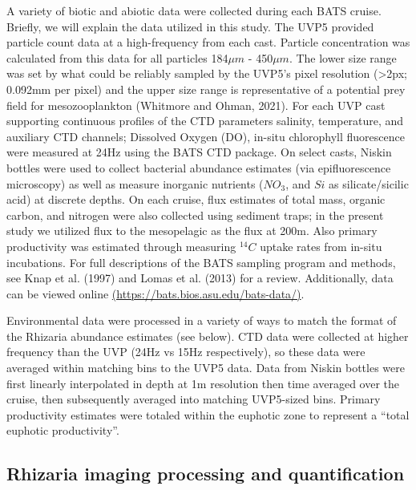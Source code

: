 \documentclass[
]{article}
\begin{document}
A variety of biotic and abiotic data were collected during each BATS
cruise. Briefly, we will explain the data utilized in this study. The
UVP5 provided particle count data at a high-frequency from each cast.
Particle concentration was calculated from this data for all particles
184\(\mu m\) - 450\(\mu m\). The lower size range was set by what could
be reliably sampled by the UVP5's pixel resolution (\textgreater2px;
0.092mm per pixel) and the upper size range is representative of a
potential prey field for mesozooplankton (Whitmore and Ohman, 2021). For
each UVP cast supporting continuous profiles of the CTD parameters
salinity, temperature, and auxiliary CTD channels; Dissolved Oxygen
(DO), in-situ chlorophyll fluorescence were measured at 24Hz using the
BATS CTD package. On select casts, Niskin bottles were used to collect
bacterial abundance estimates (via epifluorescence microscopy) as well
as measure inorganic nutrients (\(NO_3\), and \(Si\) as silicate/sicilic
acid) at discrete depths. On each cruise, flux estimates of total mass,
organic carbon, and nitrogen were also collected using sediment traps;
in the present study we utilized flux to the mesopelagic as the flux at
200m. Also primary productivity was estimated through measuring
\(^{14}C\) uptake rates from in-situ incubations. For full descriptions
of the BATS sampling program and methods, see Knap et al. (1997) and
Lomas et al. (2013) for a review. Additionally, data can be viewed
online
\href{https://bats.bios.asu.edu/bats-data/}{(https://bats.bios.asu.edu/bats-data/)}.

Environmental data were processed in a variety of ways to match the
format of the Rhizaria abundance estimates (see below). CTD data were
collected at higher frequency than the UVP (24Hz vs 15Hz respectively),
so these data were averaged within matching bins to the UVP5 data. Data
from Niskin bottles were first linearly interpolated in depth at 1m
resolution then time averaged over the cruise, then subsequently
averaged into matching UVP5-sized bins. Primary productivity estimates
were totaled within the euphotic zone to represent a ``total euphotic
productivity''.

\hypertarget{rhizaria-imaging-processing-and-quantification}{%
\subsection{Rhizaria imaging processing and
quantification}\label{rhizaria-imaging-processing-and-quantification}}
\end{document}
